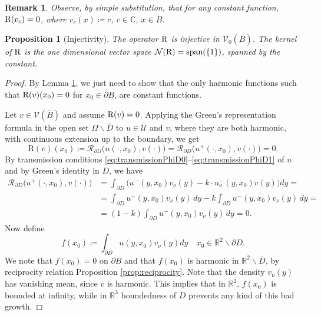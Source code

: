 \documentclass[10pt, a4paper, twoside, openright]{book}
\theoremstyle{definition}
\theoremstyle{plain}
\theoremstyle{plain}
\theoremstyle{plain}
\newtheorem{proposition}[subsection]{Proposition}
\theoremstyle{plain}
\newtheorem{remark}[subsection]{Remark}
\theoremstyle{plain}
\theoremstyle{plain}
\theoremstyle{plain}
\theoremstyle{plain}
\begin{document}
\begin{remark}
 \label{rem:kernel-R}
 Observe, by simple substitution, that for any constant function, $\textup{R}(v_c)=0$, where $v_c(x)\coloneqq c$, $c\in\mathbb{C}$, $x\in\overline{B}$.
\end{remark}
\begin{proposition}[Injectivity]
\label{prop:injectivity}
 The operator $\textup{R}$ is injective in $\mathcal{V}_0(\overline{B})$. The kernel of $\textup{R}$ is the one dimensional vector space $\mathcal{N}(\textup{R})=\textup{span}(\{1\})$, spanned by the constant.
\end{proposition}
\begin{proof}
By Lemma \ref{rem:kernel-R}, we just need to show that the only harmonic functions such that $\textup{R}(v)(x_0)=0$ for $x_0\in\partial B$, are constant functions.
\par
Let $v\in\mathcal{V}(\overline{B})$ and assume $\textup{R}(v)=0$. Applying the Green's representation formula in the open set $\Omega\backslash\overline{D}$ to $u\in\mathcal{U}$ and $v$, 
where they are both harmonic, with continuous extension up to the boundary, we get
\begin{equation}
  \text{R}(v)(x_0)\coloneqq\mathcal{R}_{\partial\Omega}\bigl(u(\cdot,x_0),v(\cdot)\bigr) = \mathcal{R}_{\partial D}\bigl(u^+(\cdot,x_0),v(\cdot)\bigr) = 0.
 \end{equation}
 By transmission conditions \eqref{eq:transmissionPhiD0}--\eqref{eq:transmissionPhiD1} of $u$ and by Green's identity in $D$, we have
 \begin{align*}
  \mathcal{R}_{\partial D}\bigl(u^+(\cdot,x_0),v(\cdot)\bigr) &= \int_{\partial D}\bigl(u^-(y,x_0)v_\nu (y) - k \cdot u^-_\nu(y,x_0)v(y)\bigr)dy = \\
  &= \int_{\partial D}u^-(y,x_0)v_\nu (y)\,dy - k\int_{\partial D}u^-(y,x_0)v_\nu (y)\,dy = \\
  &= (1-k)\int_{\partial D}u^-(y,x_0)v_\nu (y)\,dy = 0.
 \end{align*}
 Now define
 \begin{equation}
  f(x_0)\coloneqq \int_{\partial D} u(y,x_0)v_\nu(y)dy\quad x_0 \in \mathbb{R}^2\backslash\partial D.
 \end{equation}
 We note that $f(x_0)=0$ on $\partial B$ and 
 that $f(x_0)$ is harmonic in $\mathbb{R}^2\backslash\overline{D}$, by reciprocity relation Proposition \ref{prop:reciprocity}.
 Note that the density $v_\nu(y)$ has vanishing mean, since $v$ is harmonic. This implies that in $\mathbb{R}^2$, $f(x_0)$ is bounded at infinity, while in $\mathbb{R}^3$ boundedness of $D$ prevents any kind of this bad growth.

\end{proof}
\end{document}
